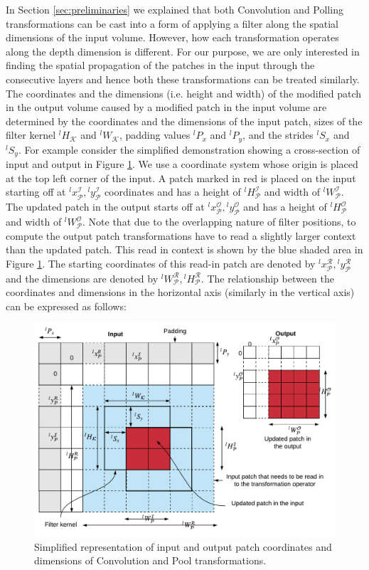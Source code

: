 In Section \ref{sec:preliminaries} we explained that both Convolution and Polling transformations can be cast into a form of applying a filter along the spatial dimensions of the input volume.
However, how each transformation operates along the depth dimension is different.
For our purpose, we are only interested in finding the spatial propagation of the patches in the input through the consecutive layers and hence both these transformations can be treated similarly.
The coordinates and the dimensions (i.e. height and width) of the modified patch in the output volume caused by a modified patch in the input volume are determined by the coordinates and the dimensions of the input patch, sizes of the filter kernel $^lH_\mathcal{K}$ and $^lW_\mathcal{K}$, padding values $^lP_x$ and $^lP_y$, and the strides $^lS_x$ and $^lS_y$.
For example consider the simplified demonstration showing a cross-section of input and output in Figure \ref{fig:dimensions}.
We use a coordinate system whose origin is placed at the top left corner of the input.
A patch marked in red is placed on the input starting off at $^lx^\mathcal{I}_\mathcal{P}, {}^ly^\mathcal{I}_\mathcal{P}$ coordinates and has a height of $^lH^\mathcal{I}_\mathcal{P}$ and width of $^lW^\mathcal{I}_\mathcal{P}$.
The updated patch in the output starts off at $^lx^\mathcal{O}_\mathcal{P}, {}^ly^\mathcal{O}_\mathcal{P}$ and has a height of $^lH^\mathcal{O}_\mathcal{P}$ and width of $^lW^\mathcal{O}_\mathcal{P}$.
Note that due to the overlapping nature of filter positions, to compute the output patch transformations have to read a slightly larger context than the updated patch.
This read in context is shown by the blue shaded area in Figure \ref{fig:dimensions}.
The starting coordinates of this read-in patch are denoted by $^lx^\mathcal{R}_\mathcal{P}, {}^ly^\mathcal{R}_\mathcal{P}$ and the dimensions are denoted by $^lW^\mathcal{R}_\mathcal{P}, {}^lH^\mathcal{R}_\mathcal{P}$.
The relationship between the coordinates and dimensions in the horizontal axis (similarly in the vertical axis) can be expressed as follows:

\begin{figure}[t]
\includegraphics[width=\columnwidth]{images/dimensions}
\caption{Simplified representation of input and output patch coordinates and dimensions of Convolution and Pool transformations.}
\label{fig:dimensions}
\end{figure}

